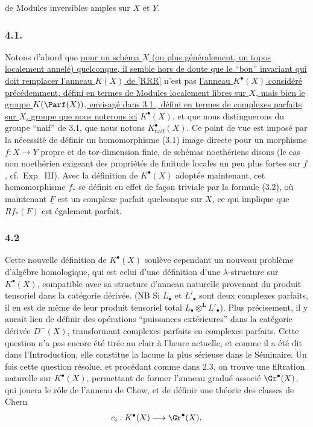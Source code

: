 de
Modules inversibles amples sur $X$ et $Y$.

\subsubsection*{4.1.}
Notons d'abord que \uline{pour un sch\'ema $X$ (ou plus g\'en\'eralement, un topos localement annel\'e) quelconque, il semble hors de doute que le ``bon'' invariant qui doit remplacer l'anneau $K(X)$ de [RRR]} n'est pas \uline{l'anneau $K^\bullet(X)$ consid\'er\'e pr\'ec\'edemment, d\'efini en termes de Modules localement libres sur $X$, mais bien le groupe $K(\Parf(X))$, envisag\'e dans 3.1., d\'efini en termes de complexes parfaits sur $X$, groupe que nous noterons ici} $K^\bullet(X)$, et que nous distinguerons du groupe ``naif'' de 3.1, que nous notons $K^\bullet_{\mathrm{naif}}(X)$. Ce point de vue est impos\'e par la n\'ecessit\'e de d\'efinir un homomorphisme (3.1) image directe pour un morphisme $f:X\to Y$ propre et de tor-dimension finie, de sch\'emas noeth\'eriens disons (le cas non noeth\'erien exigeant des propri\'et\'es de finitude locales un peu plus fortes sur $f$, cf.\ Exp.\ III). Avec la d\'efinition de $K^\bullet(X)$ adopt\'ee maintenant, cet homomorphisme $f_*$ se d\'efinit en effet de fa\c{c}on triviale par la formule (3.2), o\`u maintenant $\underline F$ est un complexe parfait quelconque sur $X$, ce qui implique que $Rf_*(\underline F)$ est \'egalement parfait.

\subsubsection*{4.2}
Cette nouvelle d\'efinition de $K^\bullet(X)$ soul\`eve cependant un nouveau probl\`eme d'alg\'ebre homologique, qui est celui d'une d\'efinition d'une $\lambda$-structure sur $K^\bullet(X)$, compatible avec sa structure d'anneau naturelle provenant du produit tensoriel dans la cat\'egorie d\'eriv\'ee. (NB Si $L_\bullet$ et $L'_\bullet$ sont deux complexes parfaits, il en est de m\^eme de leur produit tensoriel total $L_\bullet\otimes^{\mathbf L}L'_\bullet$). Plus pr\'ecisement, il y aurait lieu de d\'efinir des op\'erations ``puissances ext\'erieures'' dans la cat\'egorie d\'eriv\'ee $D^-(X)$, transformant complexes parfaits en complexes parfaits. Cette question n'a pas encore \'et\'e tir\'ee au clair \`a l'heure actuelle, et comme il a \'et\'e dit dans l'Introduction, elle constitue la lacune la plus s\'erieuse dans le S\'eminaire. Un fois cette question r\'esolue, et proc\'edant comme dans 2.3, on trouve une filtration naturelle sur $K^\bullet(X)$, permettant de former l'anneau gradu\'e associ\'e $\Gr^\bullet(X)$, qui jouera le r\^ole de l'anneau de Chow, et de d\'efinir une th\'eorie des classes de Chern
\[
c_i:K^\bullet(X)\longrightarrow \Gr^\bullet(X).
\]

